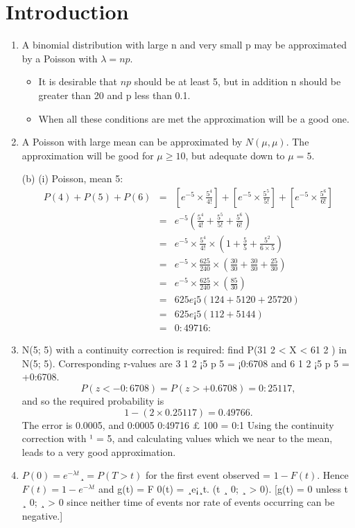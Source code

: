 \documentclass[a4paper,12pt]{article}
\begin{document}
\section{Introduction}
\begin{enumerate}
\item A binomial distribution with large n and very small p may be approximated
by a Poisson with $\lambda = np$. 
\begin{itemize}
\item It is desirable that $np$ should be at least 5, but in
addition n should be greater than 20 and p less than 0.1.

\item When all these conditions are met
the approximation will be a good one.
\end{itemize}

\item  A Poisson with large mean can be approximated by $N(\mu, \mu)$. The
approximation will be good for $\mu \geq 10$, but adequate down to $\mu = 5$.

(b) (i) Poisson, mean 5:
\begin{eqnarray*}
P(4) + P(5) + P(6) &=& 
\left[e^{-5} \times \frac{5^4}{4!}\right] + \left[e^{-5}\times \frac{5^5}{5!}\right] +  \left[ e^{-5}\times \frac{5^6}{6!} \right] 
\\
&=& 
e^{-5} \left( \frac{5^4}{4!} + \frac{5^5}{5!} +  \frac{5^6}{6!} \right)
\\
&=& 
e^{-5} \times \frac{5^4}{4!} \times \left( 1 + \frac{5}{5} +  \frac{5^2}{6 \times 5} \right)
\\
&=& 
e^{-5} \times \frac{625}{240} \times \left(\frac{30}{30} + \frac{30}{30} +  \frac{25}{30} \right)
\\
&=& 
e^{-5} \times \frac{625}{240} \times \left(   \frac{85}{30} \right)
\\
&=& 625e¡5( 1
24 + 5
120 + 25
720 )\\ &=& 625e¡5( 1
12 + 5
144 )\\ &=& 0:49716:
\end{eqnarray*}
\item  N(5; 5) with a continuity correction is required: find P(31
2 < X < 61
2 ) in
N(5; 5). Corresponding r-values are 3 1
2
¡5
p
5
= ¡0:6708 and 6 1
2
¡5
p
5
= +0:6708.
\[P(z < -0:6708) = P(z > +0.6708) = 0:25117,\] and so the required probability
is \[1 - (2 \times 0.25117) = 0.49766.\] The error is 0.0005, and %
0:0005
0:49716 £ 100 = 0:1%
Using the continuity correction with ¹ = 5, and calculating values which we
near to the mean, leads to a very good approximation.
\item  $P(0) = e^{-\lambda t}¸ = P(T > t)$ for the first event observed = $1 - F(t)$. Hence
$F(t) = 1 - e^{-\lambda t}$ and g(t) = F
0(t) = ¸e¡¸t. (t ¸ 0; ¸ > 0).
[g(t) = 0 unless t ¸ 0; ¸ > 0 since neither time of events nor rate of events
occurring can be negative.] 



\end{enumerate}
\end{document}
